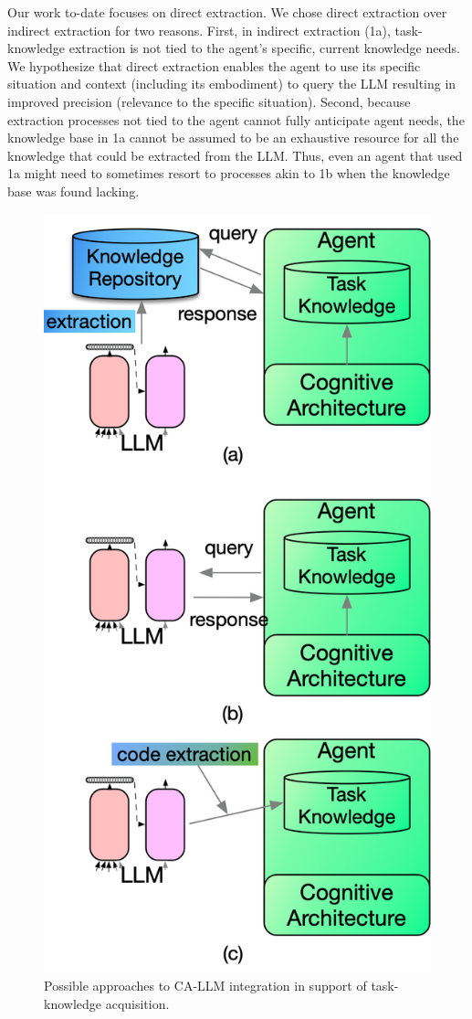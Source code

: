 \documentclass[letterpaper]{article} %
\begin{document}
Our work to-date focuses on direct extraction. We chose direct extraction over indirect extraction for two reasons. First, in indirect extraction (1a), task-knowledge extraction is not tied to the agent's specific, current knowledge needs. We hypothesize that direct extraction enables the agent to use its specific situation and context (including its embodiment) to query the LLM resulting in improved precision (relevance to the specific situation). Second, because extraction processes not tied to the agent cannot fully anticipate agent needs, the knowledge base in 1a cannot be assumed to be an exhaustive resource for all the knowledge that could be extracted from the LLM. Thus, even an agent that used 1a might need to sometimes resort to processes akin to 1b when the knowledge base was found lacking.

\begin{figure}[t]
    \centering
    \includegraphics[width=.9\columnwidth]{figures/IntegrationOptions.png}
    \caption{Possible approaches to CA-LLM integration in support of task-knowledge acquisition.}
    \label{fig:integration-patterns}
\end{figure}
\end{document}
